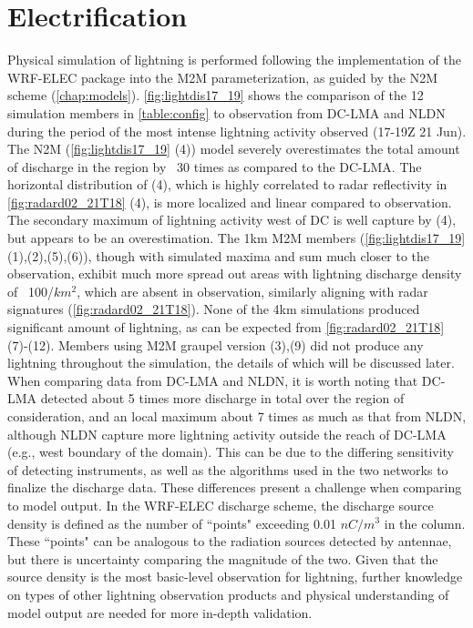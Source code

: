 \section{Electrification}
\label{sec:electrification}
Physical simulation of lightning is performed following the implementation of the WRF-ELEC package into the M2M parameterization, as guided by the N2M scheme (\ref{chap:models}). \ref{fig:lightdis17_19} shows the comparison of the 12 simulation members in \ref{table:config} to observation from DC-LMA and NLDN during the period of the most intense lightning activity observed (17-19Z 21 Jun).  The N2M (\ref{fig:lightdis17_19} (4)) model severely overestimates the total amount of discharge in the region by ~30 times as compared to the DC-LMA. The horizontal distribution of (4), which is highly correlated to radar reflectivity in \ref{fig:radard02_21T18} (4), is more localized and linear compared to observation. The secondary maximum of lightning activity west of DC is well capture by (4), but appears to be an overestimation. The 1km M2M members (\ref{fig:lightdis17_19} (1),(2),(5),(6)), though with simulated maxima and sum much closer to the observation, exhibit much more spread out areas with lightning discharge density of ~100/$km^2$, which are absent in observation, similarly aligning with radar signatures (\ref{fig:radard02_21T18}). None of the 4km simulations produced significant amount of lightning, as can be expected from \ref{fig:radard02_21T18} (7)-(12). Members using M2M graupel version (3),(9) did not produce any lightning throughout the simulation, the details of which will be discussed later. When comparing data from DC-LMA and NLDN, it is worth noting that DC-LMA detected about 5 times more discharge in total over the region of consideration, and an local maximum about 7 times as much as that from NLDN, although NLDN capture more lightning activity outside the reach of DC-LMA (e.g., west boundary of the domain). This can be due to the differing sensitivity of detecting instruments, as well as the algorithms used in the two networks to finalize the discharge data. These differences present a challenge when comparing to model output. In the WRF-ELEC discharge scheme, the discharge source density is defined as the number of ``points" exceeding 0.01 $nC/m^3$ in the column. These ``points" can be analogous to the radiation sources detected by antennae, but there is uncertainty comparing the magnitude of the two.  Given that the source density is the most basic-level observation for lightning, further knowledge on types of other lightning observation products and physical understanding of model output are needed for more in-depth validation.


